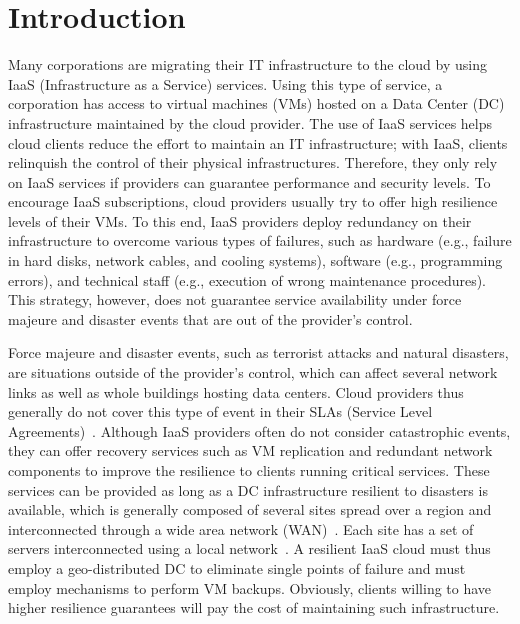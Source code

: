 \documentclass[preprint]{elsarticle}
\begin{document}
     
\section{Introduction}

Many corporations are migrating their IT infrastructure to the cloud by using IaaS (Infrastructure as a Service) services.
Using this type of service, a corporation has access to virtual machines (VMs) hosted on a Data Center (DC) infrastructure maintained by the cloud provider. The use of IaaS services helps cloud clients reduce the effort to maintain an IT infrastructure; with IaaS, clients relinquish the control of their physical infrastructures. Therefore, they only rely on IaaS services if providers can guarantee performance and security levels. To encourage IaaS subscriptions, cloud providers usually try to offer high resilience levels of their VMs. To this end, IaaS providers deploy redundancy on their infrastructure to overcome various types of failures, such as hardware (e.g., failure in hard disks, network cables, and cooling systems), software (e.g., programming errors), and technical staff (e.g., execution of wrong maintenance procedures). This strategy, however, does not guarantee service availability under force majeure and disaster events that are out of the provider's control. 

Force majeure and disaster events, such as terrorist attacks and natural disasters, are situations outside of the provider's control, which can affect several network links as well as whole buildings hosting data centers. Cloud providers thus generally do not cover this type of event in their SLAs (Service Level Agreements)~\cite{couto2014Network}. Although IaaS providers often do not consider catastrophic events, they can offer recovery services such as VM replication and redundant network components to improve the resilience to clients running critical services. These services can be provided as long as a DC infrastructure resilient to disasters is available, which is generally composed of several sites spread over a region and interconnected through a wide area network (WAN)~\cite{secci2014Cloud}. Each site has a set of servers interconnected using a local network~\cite{couto2012Reliability,ferraz2014Two}.
A resilient IaaS cloud must thus employ a geo-distributed DC to eliminate single points of failure and must employ mechanisms to perform VM backups. Obviously, clients willing to have higher resilience guarantees will pay the cost of maintaining such infrastructure.
\end{document}
